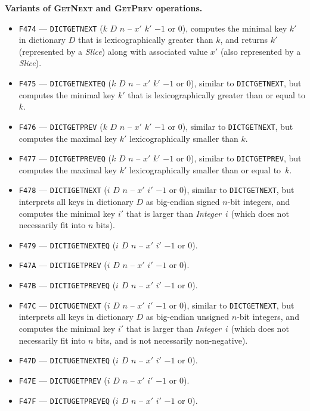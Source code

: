 \documentclass[12pt,oneside]{article}
\def\makepoint#1{\medbreak\noindent{\bf #1.\ }}
\def\nxsubpoint{\refstepcounter{subsubsection}%
    \smallbreak\makepoint{\thesubsubsection}}
\def\emb#1{\textbf{#1.}}
\begin{document}
\nxsubpoint\emb{Variants of \textsc{GetNext} and \textsc{GetPrev} operations}
\begin{itemize}
\item {\tt F474} --- {\tt DICTGETNEXT} ($k$ $D$ $n$ -- $x'$ $k'$ $-1$ or $0$), computes the minimal key $k'$ in dictionary $D$ that is lexicographically greater than $k$, and returns $k'$ (represented by a {\em Slice\/}) along with associated value $x'$ (also represented by a {\em Slice\/}).
\item {\tt F475} --- {\tt DICTGETNEXTEQ} ($k$ $D$ $n$ -- $x'$ $k'$ $-1$ or $0$), similar to {\tt DICTGETNEXT}, but computes the minimal key $k'$ that is lexicographically greater than or equal to $k$.
\item {\tt F476} --- {\tt DICTGETPREV} ($k$ $D$ $n$ -- $x'$ $k'$ $-1$ or $0$), similar to {\tt DICTGETNEXT}, but computes the maximal key $k'$ lexicographically smaller than $k$.
\item {\tt F477} --- {\tt DICTGETPREVEQ} ($k$ $D$ $n$ -- $x'$ $k'$ $-1$ or $0$), similar to {\tt DICTGETPREV}, but computes the maximal key $k'$ lexicographically smaller than or equal to~$k$.
\item {\tt F478} --- {\tt DICTIGETNEXT} ($i$ $D$ $n$ -- $x'$ $i'$ $-1$ or $0$), similar to {\tt DICTGETNEXT}, but interprets all keys in dictionary $D$ as big-endian signed $n$-bit integers, and computes the minimal key $i'$ that is larger than {\em Integer}~$i$ (which does not necessarily fit into $n$ bits).
\item {\tt F479} --- {\tt DICTIGETNEXTEQ} ($i$ $D$ $n$ -- $x'$ $i'$ $-1$ or $0$).
\item {\tt F47A} --- {\tt DICTIGETPREV} ($i$ $D$ $n$ -- $x'$ $i'$ $-1$ or $0$).
\item {\tt F47B} --- {\tt DICTIGETPREVEQ} ($i$ $D$ $n$ -- $x'$ $i'$ $-1$ or $0$).
\item {\tt F47C} --- {\tt DICTUGETNEXT} ($i$ $D$ $n$ -- $x'$ $i'$ $-1$ or $0$), similar to {\tt DICTGETNEXT}, but interprets all keys in dictionary $D$ as big-endian unsigned $n$-bit integers, and computes the minimal key $i'$ that is larger than {\em Integer}~$i$ (which does not necessarily fit into $n$ bits, and is not necessarily non-negative).
\item {\tt F47D} --- {\tt DICTUGETNEXTEQ} ($i$ $D$ $n$ -- $x'$ $i'$ $-1$ or $0$).
\item {\tt F47E} --- {\tt DICTUGETPREV} ($i$ $D$ $n$ -- $x'$ $i'$ $-1$ or $0$).
\item {\tt F47F} --- {\tt DICTUGETPREVEQ} ($i$ $D$ $n$ -- $x'$ $i'$ $-1$ or $0$).
\end{itemize}
\end{document}
